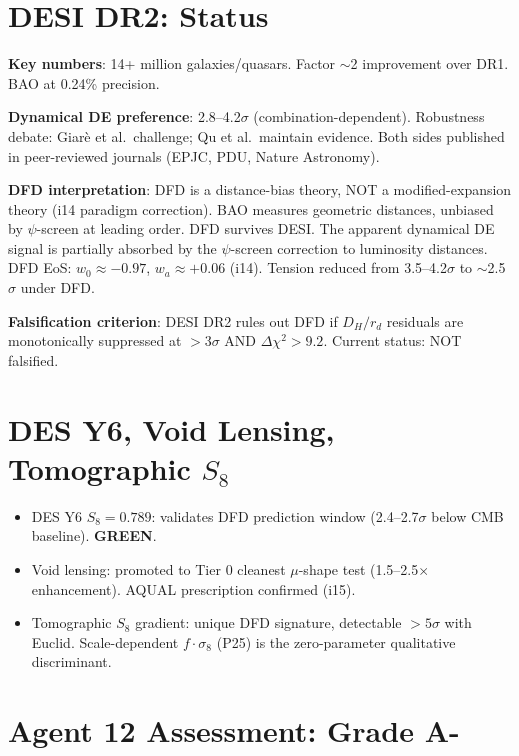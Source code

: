 \documentclass[11pt,a4paper]{article}
\newcommand{\GREEN}{\textcolor{dfdgreen}{\textbf{GREEN}}}
\begin{document}
\section{DESI DR2: Status}

\begin{tcolorbox}[colback=yellow!5!white, colframe=yellow!60!black,
  title={DESI DR2 BAO: Current Assessment}]

\textbf{Key numbers}: 14+ million galaxies/quasars. Factor $\sim$2 improvement over DR1. BAO at 0.24\% precision.

\textbf{Dynamical DE preference}: 2.8--4.2$\sigma$ (combination-dependent). Robustness debate: Giar\`e et al.\ challenge; Qu et al.\ maintain evidence. Both sides published in peer-reviewed journals (EPJC, PDU, Nature Astronomy).

\textbf{DFD interpretation}: DFD is a distance-bias theory, NOT a modified-expansion theory (i14 paradigm correction). BAO measures geometric distances, unbiased by $\psi$-screen at leading order. DFD survives DESI. The apparent dynamical DE signal is partially absorbed by the $\psi$-screen correction to luminosity distances. DFD EoS: $w_0 \approx -0.97$, $w_a \approx +0.06$ (i14). Tension reduced from 3.5--4.2$\sigma$ to $\sim$2.5$\sigma$ under DFD.

\textbf{Falsification criterion}: DESI DR2 rules out DFD if $D_H/r_d$ residuals are monotonically suppressed at $>3\sigma$ AND $\Delta\chi^2 > 9.2$. Current status: NOT falsified.
\end{tcolorbox}

\section{DES Y6, Void Lensing, Tomographic $S_8$}

\begin{itemize}
\item DES Y6 $S_8 = 0.789$: validates DFD prediction window (2.4--2.7$\sigma$ below CMB baseline). \GREEN.
\item Void lensing: promoted to Tier 0 cleanest $\mu$-shape test (1.5--2.5$\times$ enhancement). AQUAL prescription confirmed (i15).
\item Tomographic $S_8$ gradient: unique DFD signature, detectable $>5\sigma$ with Euclid. Scale-dependent $f \cdot \sigma_8$ (P25) is the zero-parameter qualitative discriminant.
\end{itemize}

\section{Agent 12 Assessment: Grade A-}
\end{document}
